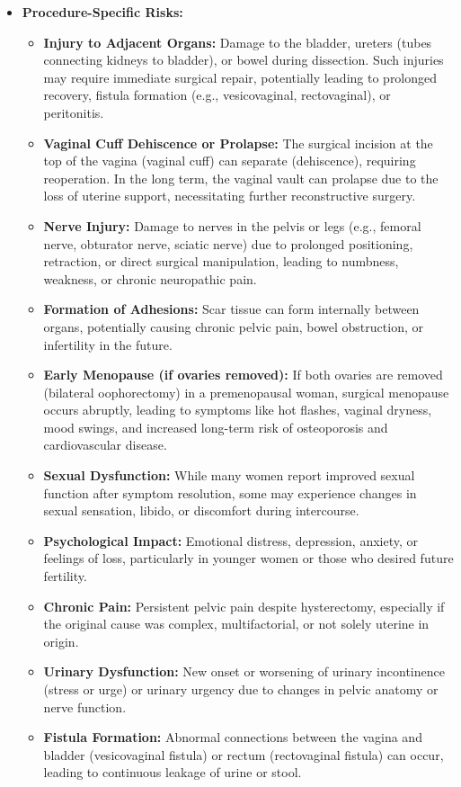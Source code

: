 \begin{itemize}
  \item \textbf{Procedure-Specific Risks:}
    \begin{itemize}
      \item \textbf{Injury to Adjacent Organs:} Damage to the bladder, ureters (tubes connecting kidneys to bladder), or bowel during dissection. Such injuries may require immediate surgical repair, potentially leading to prolonged recovery, fistula formation (e.g., vesicovaginal, rectovaginal), or peritonitis.
      \item \textbf{Vaginal Cuff Dehiscence or Prolapse:} The surgical incision at the top of the vagina (vaginal cuff) can separate (dehiscence), requiring reoperation. In the long term, the vaginal vault can prolapse due to the loss of uterine support, necessitating further reconstructive surgery.
      \item \textbf{Nerve Injury:} Damage to nerves in the pelvis or legs (e.g., femoral nerve, obturator nerve, sciatic nerve) due to prolonged positioning, retraction, or direct surgical manipulation, leading to numbness, weakness, or chronic neuropathic pain.
      \item \textbf{Formation of Adhesions:} Scar tissue can form internally between organs, potentially causing chronic pelvic pain, bowel obstruction, or infertility in the future.
      \item \textbf{Early Menopause (if ovaries removed):} If both ovaries are removed (bilateral oophorectomy) in a premenopausal woman, surgical menopause occurs abruptly, leading to symptoms like hot flashes, vaginal dryness, mood swings, and increased long-term risk of osteoporosis and cardiovascular disease.
      \item \textbf{Sexual Dysfunction:} While many women report improved sexual function after symptom resolution, some may experience changes in sexual sensation, libido, or discomfort during intercourse.
      \item \textbf{Psychological Impact:} Emotional distress, depression, anxiety, or feelings of loss, particularly in younger women or those who desired future fertility.
      \item \textbf{Chronic Pain:} Persistent pelvic pain despite hysterectomy, especially if the original cause was complex, multifactorial, or not solely uterine in origin.
      \item \textbf{Urinary Dysfunction:} New onset or worsening of urinary incontinence (stress or urge) or urinary urgency due to changes in pelvic anatomy or nerve function.
      \item \textbf{Fistula Formation:} Abnormal connections between the vagina and bladder (vesicovaginal fistula) or rectum (rectovaginal fistula) can occur, leading to continuous leakage of urine or stool.
    \end{itemize}
\end{itemize}

